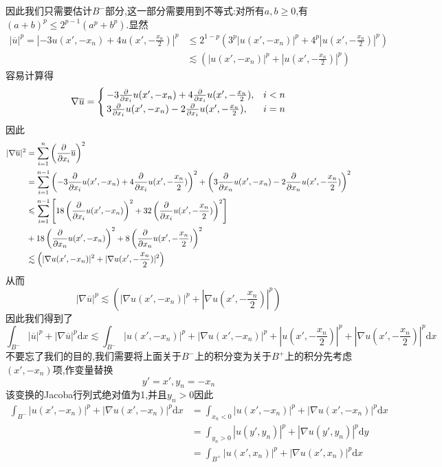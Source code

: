 因此我们只需要估计$B^-$部分,这一部分需要用到不等式:对所有$a,b\geqslant 0$,有$(a+b)^p\leqslant 2^{p-1}(a^p+b^p)$.显然
$$
\begin{aligned}
|\overline{u}|^p=|-3u(x',-x_n)+4u(x',-\frac{x_n}{2})|^p &\leqslant 2^{1-p}\left(3^p|u(x',-x_n)|^p+4^p|u(x',-\frac{x_n}{2})|^p\right)\\
                                                        &\lesssim \left(|u(x',-x_n)|^p+|u(x',-\frac{x_n}{2})|^p\right)
\end{aligned}
$$
容易计算得
$$
\nabla \overline{u}=
\begin{cases}
    -3\frac{\partial}{\partial x_i}u(x',-x_n)+4\frac{\partial}{\partial x_i}u(x',-\frac{x_n}{2}),&i<n\\
    3\frac{\partial}{\partial x_i}u(x',-x_n)-2\frac{\partial}{\partial x_i}u(x',-\frac{x_n}{2}),&i=n
\end{cases}
$$
因此
$$
\begin{aligned}
    |\nabla\overline{u}|^2 &= \sum^n_{i=1}\left(\frac{\partial}{\partial x_i}\overline{u}\right)^2 \\
    &= \sum^{n-1}_{i=1}\left(-3\frac{\partial}{\partial x_i}u(x',-x_n)+4\frac{\partial}{\partial x_i}u(x',-\frac{x_n}{2})\right)^2+\left(3\frac{\partial}{\partial x_n}u(x',-x_n)-2\frac{\partial}{\partial x_n}u(x',-\frac{x_n}{2})\right)^2\\
    & \leqslant\sum^{n-1}_{i=1}\left[18\left(\frac{\partial}{\partial x_i}u(x',-x_n)\right)^2+32\left(\frac{\partial}{\partial x_i}u(x',-\frac{x_n}{2})\right)^2\right]\\
    &+18\left(\frac{\partial}{\partial x_n}u(x',-x_n)\right)^2+8\left(\frac{\partial}{\partial x_n}u(x',-\frac{x_n}{2})\right)^2\\
    & \lesssim \left(|\nabla u(x',-x_n)|^2+|\nabla u(x',-\frac{x_n}{2})|^2\right)
\end{aligned}
$$
从而
$$
|\nabla\overline{u}|^p\lesssim \left(|\nabla u(x',-x_n)|^p+|\nabla u(x',-\frac{x_n}{2})|^p\right)
$$
因此我们得到了
$$
\int_{B^-}|\overline{u}|^p+|\nabla \overline{u}|^p\mathrm{d}x\lesssim \int_{B^-}|u(x',-x_n)|^p+|\nabla u(x',-x_n)|^p+|u(x',-\frac{x_n}{2})|^p+|\nabla u(x',-\frac{x_n}{2})|^p\mathrm{d}x
$$
不要忘了我们的目的,我们需要将上面关于$B^-$上的积分变为关于$B^+$上的积分先考虑$(x',-x_n)$项,作变量替换
$$
y'=x',y_n=-x_n
$$
该变换的Jacoba行列式绝对值为1,并且$y_n>0$因此
$$
\begin{aligned}
    \int_{B^-}|u(x',-x_n)|^p+|\nabla u(x',-x_n)|^p\mathrm{d}x &=\int_{x_n<0}|u(x',-x_n)|^p+|\nabla u(x',-x_n)|^p\mathrm{d}x\\
                                                              &=\int_{y_n>0}|u(y',y_n)|^p+|\nabla u(y',y_n)|^p\mathrm{d}y\\
                                                              &=\int_{B^+}|u(x',x_n)|^p+|\nabla u(x',x_n)|^p\mathrm{d}x
\end{aligned}
$$
